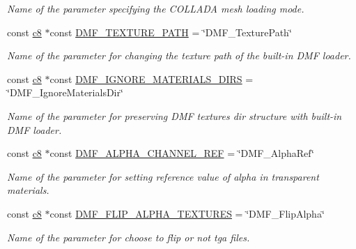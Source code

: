 \begin{DoxyCompactItemize}
\begin{DoxyCompactList}\small\item\em Name of the parameter specifying the C\+O\+L\+L\+A\+DA mesh loading mode. \end{DoxyCompactList}\item 
const \hyperlink{namespaceirr_a9395eaea339bcb546b319e9c96bf7410}{c8} $\ast$const \hyperlink{namespaceirr_1_1scene_a0dc81c29a0fa37b3aa7c9dcfc9828eaa}{D\+M\+F\+\_\+\+T\+E\+X\+T\+U\+R\+E\+\_\+\+P\+A\+TH} = \char`\"{}D\+M\+F\+\_\+\+Texture\+Path\char`\"{}
\begin{DoxyCompactList}\small\item\em Name of the parameter for changing the texture path of the built-\/in D\+MF loader. \end{DoxyCompactList}\item 
const \hyperlink{namespaceirr_a9395eaea339bcb546b319e9c96bf7410}{c8} $\ast$const \hyperlink{namespaceirr_1_1scene_a65c32f1534d2bff391ded668a748e39b}{D\+M\+F\+\_\+\+I\+G\+N\+O\+R\+E\+\_\+\+M\+A\+T\+E\+R\+I\+A\+L\+S\+\_\+\+D\+I\+RS} = \char`\"{}D\+M\+F\+\_\+\+Ignore\+Materials\+Dir\char`\"{}
\begin{DoxyCompactList}\small\item\em Name of the parameter for preserving D\+MF textures dir structure with built-\/in D\+MF loader. \end{DoxyCompactList}\item 
const \hyperlink{namespaceirr_a9395eaea339bcb546b319e9c96bf7410}{c8} $\ast$const \hyperlink{namespaceirr_1_1scene_a21e42b7847ca0eed258b80aac458b7dd}{D\+M\+F\+\_\+\+A\+L\+P\+H\+A\+\_\+\+C\+H\+A\+N\+N\+E\+L\+\_\+\+R\+EF} = \char`\"{}D\+M\+F\+\_\+\+Alpha\+Ref\char`\"{}
\begin{DoxyCompactList}\small\item\em Name of the parameter for setting reference value of alpha in transparent materials. \end{DoxyCompactList}\item 
const \hyperlink{namespaceirr_a9395eaea339bcb546b319e9c96bf7410}{c8} $\ast$const \hyperlink{namespaceirr_1_1scene_ae28846d2b02cbfc70c6771919a3b5edd}{D\+M\+F\+\_\+\+F\+L\+I\+P\+\_\+\+A\+L\+P\+H\+A\+\_\+\+T\+E\+X\+T\+U\+R\+ES} = \char`\"{}D\+M\+F\+\_\+\+Flip\+Alpha\char`\"{}
\begin{DoxyCompactList}\small\item\em Name of the parameter for choose to flip or not tga files. \end{DoxyCompactList}\item 

\end{DoxyCompactItemize}
